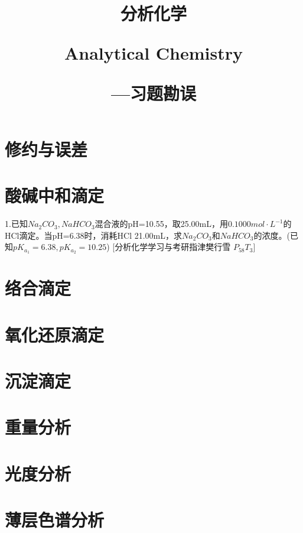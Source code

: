 \documentclass[a3paper]{book}
\title{\centering \dy \hwzs 分析化学
	
	\hspace*{\fill}
	
	 \hwxw \xiaochu  Analytical Chemistry
	

	\dy \quad\quad\quad —\dsi 习题勘误
	
	\hspace*{\fill}
}
\date{}
\author{}
\newcommand{\erhao}{\fontsize{22.1pt}{\baselineskip}\selectfont}
\newcommand{\xiaosi}{\fontsize{12.1pt}{\baselineskip}\selectfont}
\newcommand {\hwxw} {\CJKfamily{hwxw}}
\begin{document}
	\maketitle
	
	\pagestyle{empty}
	\tableofcontents
	
\newpage
	\pagestyle{fancy}
	\chapter{\erhao 修约与误差}



\newpage
	\pagestyle{fancy}
	\chapter{\erhao 酸碱中和滴定}

\xiaosi \heiti 1.已知$Na_{2}CO_{3},NaHCO_{3}$混合液的pH=10.55，取25.00mL，用$0.1000mol·L^{-1}$的HCl滴定。当pH=6.38时，消耗HCl 21.00mL，求$Na_{2}CO_{3}\mbox{和}NaHCO_{3}$的浓度。(已知$pK_{a_{1}}=6.38,pK_{a_{2}}=10.25$)
\hfill [\hwxw 分析化学学习与考研指津\quad 樊行雪 \quad $P_{58}$\quad $T_{3}$]



\newpage
	\pagestyle{fancy}
	\chapter{\erhao 络合滴定}
	
\newpage
	\pagestyle{fancy}
	\chapter{\erhao 氧化还原滴定}
	
	
\newpage
	\pagestyle{fancy}
	\chapter{\erhao 沉淀滴定}
		
\newpage
	\pagestyle{fancy}
	\chapter{\erhao 重量分析}
	
\newpage
	\pagestyle{fancy}
	\chapter{\erhao 光度分析}
	
\newpage
	\pagestyle{fancy}
	\chapter{\erhao 薄层色谱分析}
\end{document}
